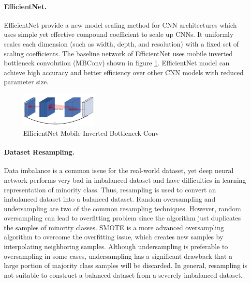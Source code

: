 \documentclass[10pt,twocolumn,letterpaper]{article}
\begin{document}
\paragraph{EfficientNet.} EfficientNet \cite{tan_efficientnet_2020} provide a new model scaling method for CNN architectures which uses simple yet effective compound coefficient to scale up CNNs. It uniformly scales each dimension (such as width, depth, and resolution) with a fixed set of scaling coefficients. The baseline network of EfficientNet uses mobile inverted bottleneck convolution (MBConv) shown in figure \ref{fig:efficientnet_conv}. EfficientNet model can achieve high accuracy and better efficiency over other CNN models with reduced parameter size.

\begin{figure}
    \centering
    \includegraphics[width=0.35\textwidth]{COMP4471_Final_Report/img/MBConv.png}
    \caption{EfficientNet Mobile Inverted Bottleneck Conv \cite{tan_efficientnet_2020}}
    \label{fig:efficientnet_conv}
\end{figure}

\paragraph{Dataset Resampling.} Data imbalance is a common issue for the real-world dataset, yet deep neural network performs very bad in imbalanced dataset \cite{buda_systematic_2018} and have difficulties in learning representation of minority class. Thus, resampling is used to convert an imbalanced dataset into a balanced dataset. Random oversampling and undersampling are two of the common resampling techniques. However, random oversampling can lead to overfitting problem \cite{chawla_smote_2002} since the algorithm just duplicates the samples of minority classes. SMOTE \cite{chawla_smote_2002} is a more advanced oversampling algorithm to overcome the overfitting issue, which creates new samples by interpolating neighboring samples. Although undersampling is preferable to oversampling in some cases, undersampling has a significant drawback that a large portion of majority class samples will be discarded. In general, resampling is not suitable to construct a balanced dataset from a severely imbalanced dataset.
\end{document}
